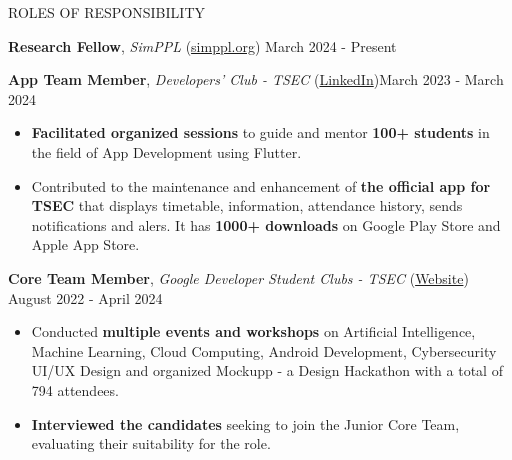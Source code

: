 \documentclass{resume} %
\begin{document}
\begin{rSection}{ROLES OF RESPONSIBILITY}

    \textbf{Research Fellow}, \textit{SimPPL} (\href{https://simppl.org/}{simppl.org}) \hfill March 2024 - Present

    \textbf{App Team Member}, \textit{Developers' Club - TSEC} (\href{https://www.linkedin.com/in/developer-s-club-tsec/}{LinkedIn})\hfill March 2023 - March 2024
    \begin{itemize}
        \itemsep -6pt {}
        \item \textbf{Facilitated organized sessions} to guide and mentor \textbf{100+ students} in the field of App Development using Flutter.
        \item Contributed to the maintenance and enhancement of \textbf{the official app for TSEC} that displays timetable, information, attendance history, sends notifications and alers. It has \textbf{1000+ downloads} on Google Play Store and Apple App Store.
    \end{itemize}

    \textbf{Core Team Member}, \textit{Google Developer Student Clubs - TSEC} (\href{https://gdsc.community.dev/thadomal-shahani-engineering-college-mumbai/}{Website})  \hfill August 2022 - April 2024
    \begin{itemize}
        \itemsep -6pt {}
        \item Conducted \textbf{multiple events and workshops} on Artificial Intelligence, Machine Learning, Cloud Computing, Android Development, Cybersecurity UI/UX Design and organized Mockupp - a Design Hackathon with a total of 794 attendees.
        \item \textbf{Interviewed the candidates} seeking to join the Junior Core Team, evaluating their suitability for the role.
    \end{itemize}

\end{rSection}

\end{document}
